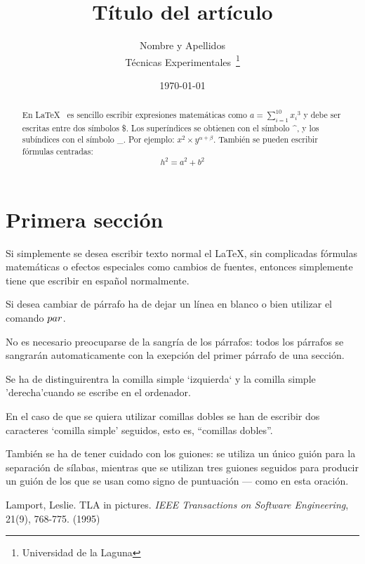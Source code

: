 \documentclass[a4paper,12pt]{article}
\begin{document}
\title{Título del artículo}
\author{Nombre y Apellidos \\
        Técnicas Experimentales~\footnote{Universidad de la Laguna}
        }
\date{\today}
\maketitle
\begin{abstract}
  En \LaTeX{}~\cite{Lam:86} es sencillo escribir expresiones
  matemáticas como $a=\sum_{i=1}^{10} {x_i}^{3}$
  y debe ser escritas entre dos símbolos \$.
  Los superíndices se obtienen con el símbolo \^{}, y
  los subíndices con el símbolo \_.
  Por ejemplo: $x^2 \times y^{\alpha + \beta}$.
  También se pueden escribir fórmulas centradas:
  \[h^2=a^2 + b^2 \]
\end{abstract}

\section{Primera sección}
Si simplemente se desea escribir texto normal el LaTeX,
sin complicadas f\'ormulas matem\'aticas o efectos especiales
como cambios de fuentes, entonces simplemente tiene que escribir
en espa\~nol normalmente.\par
Si desea cambiar de párrafo ha de dejar un línea en blanco o bien
utilizar el comando $\\par$.


No es necesario preocuparse de la sangría de los párrafos:
todos los párrafos se sangrarán automaticamente con la exepción
del primer párrafo de una sección.

Se ha de distinguirentra la comilla simple `izquierda`
y la comilla simple 'derecha'cuando se escribe en el ordenador.

En el caso de que se quiera utilizar comillas dobles se han de
escribir dos caracteres `comilla simple' seguidos, esto es,
``comillas dobles''. 
 
También se ha de tener cuidado con los guiones: se utiliza un único
guión para la separación de sílabas, mientras que se utilizan
tres guiones seguidos para producir un guión de los que se usan
como signo de puntuación --- como en esta oración.

\begin{thebibliography}{00}
    Lamport, Leslie.
    TLA in pictures.
    \emph{IEEE Transactions on Software Engineering},
    21(9), 768-775.
    (1995)
\end{thebibliography}
\end{document}
